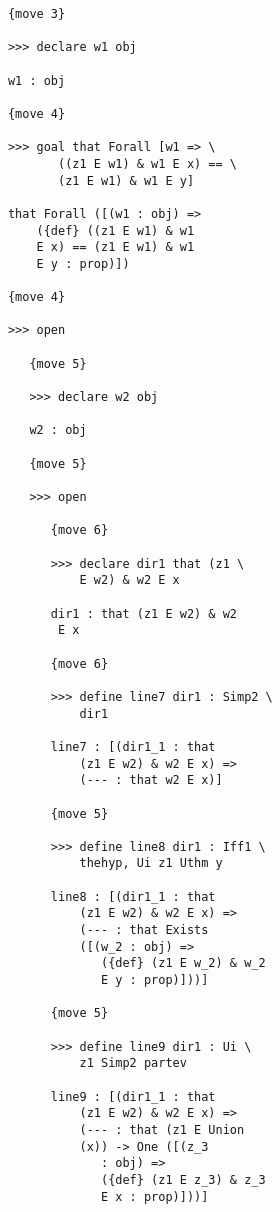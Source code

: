 \documentclass[12pt]{article}
\begin{document}
\begin{verbatim}
            {move 3}

            >>> declare w1 obj

            w1 : obj

            {move 4}

            >>> goal that Forall [w1 => \
                   ((z1 E w1) & w1 E x) == \
                   (z1 E w1) & w1 E y]

            that Forall ([(w1 : obj) => 
                ({def} ((z1 E w1) & w1 
                E x) == (z1 E w1) & w1 
                E y : prop)])

            {move 4}

            >>> open

               {move 5}

               >>> declare w2 obj

               w2 : obj

               {move 5}

               >>> open

                  {move 6}

                  >>> declare dir1 that (z1 \
                      E w2) & w2 E x

                  dir1 : that (z1 E w2) & w2 
                   E x

                  {move 6}

                  >>> define line7 dir1 : Simp2 \
                      dir1

                  line7 : [(dir1_1 : that 
                      (z1 E w2) & w2 E x) => 
                      (--- : that w2 E x)]

                  {move 5}

                  >>> define line8 dir1 : Iff1 \
                      thehyp, Ui z1 Uthm y

                  line8 : [(dir1_1 : that 
                      (z1 E w2) & w2 E x) => 
                      (--- : that Exists 
                      ([(w_2 : obj) => 
                         ({def} (z1 E w_2) & w_2 
                         E y : prop)]))]

                  {move 5}

                  >>> define line9 dir1 : Ui \
                      z1 Simp2 partev

                  line9 : [(dir1_1 : that 
                      (z1 E w2) & w2 E x) => 
                      (--- : that (z1 E Union 
                      (x)) -> One ([(z_3 
                         : obj) => 
                         ({def} (z1 E z_3) & z_3 
                         E x : prop)]))]


\end{verbatim}
\end{document}
